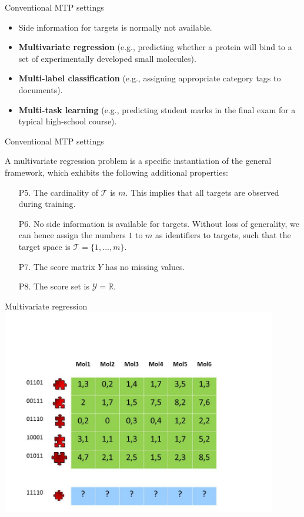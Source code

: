 \documentclass[]{beamer}
\renewcommand{\emph}[1]{\textbf{\color{putblue}#1}}
\begin{document}
\begin{frame}{Conventional MTP settings}
\begin{itemize}
\item Side information for targets is normally not available. 
\item \emph{Multivariate regression} (e.g., predicting whether a protein will bind to a set of experimentally developed small molecules).
\item \emph{Multi-label classification} (e.g., assigning appropriate category tags to documents).
\item \emph{Multi-task learning} (e.g., predicting student marks in the final exam for a typical high-school course).
\end{itemize}
\end{frame}

\begin{frame}{Conventional MTP settings}
\begin{definition} 
A multivariate regression problem is a specific instantiation of the general framework, which exhibits the following additional properties: 
\begin{enumerate}
\item[P5.] The cardinality of $\mathcal{T}$ is $m$. This implies that all targets are observed during training. 
\item[P6.] No side information is available for targets. Without loss of generality, we can hence assign the numbers $1$ to $m$ as identifiers to targets, such that the target space is $\mathcal{T} = \{1,...,m\}$. 
\item[P7.] The score matrix $Y$ has no missing values. 
\item[P8.] The score set is $\mathcal{Y} = \mathbb{R}$. 
\end{enumerate}
\end{definition}
\end{frame}


\begin{frame}{Multivariate regression}
\includegraphics[width=0.9\textwidth,trim = 0 0 100 100,clip]{Figures/pictures/Slide1}
\end{frame}
\end{document}
